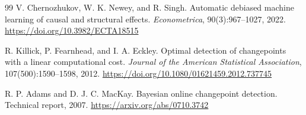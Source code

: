 \documentclass[10pt]{article}
\begin{document}
\begin{thebibliography}{99}
V. Chernozhukov, W. K. Newey, and R. Singh.
Automatic debiased machine learning of causal and structural effects.
\emph{Econometrica}, 90(3):967--1027, 2022.
\url{https://doi.org/10.3982/ECTA18515}

R. Killick, P. Fearnhead, and I. A. Eckley.
Optimal detection of changepoints with a linear computational cost.
\emph{Journal of the American Statistical Association}, 107(500):1590--1598, 2012.
\url{https://doi.org/10.1080/01621459.2012.737745}

R. P. Adams and D. J. C. MacKay.
Bayesian online changepoint detection.
Technical report, 2007.
\url{https://arxiv.org/abs/0710.3742}

\end{thebibliography}
\end{document}
